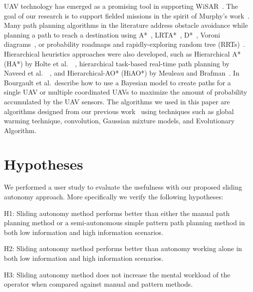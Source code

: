 \documentclass[journal]{IEEEtran}
\begin{document}
UAV technology has emerged as a promising tool in supporting WiSAR~\cite{Murphy2008Cooperative,Bourgault2003Coordinated}. The goal of our research is to support fielded missions in the spirit of Murphy's work~\cite{Casper2003Human}. Many path planning algorithms in the literature address obstacle avoidance while planning a path to reach a destination using A*~\cite{Quigley2005Towards}, LRTA*~\cite{Howlett2006Learning}, D*~\cite{Stentz1997Optimal}, Voroni diagrams~\cite{Bortoff2000Path,Beard2005Autonomous}, or probability roadmaps and rapidly-exploring random tree (RRTs)~\cite{Pettersson2006Probabilistic}. Hierarchical heuristics approaches were also developed, such as Hierarchical A* (HA*) by Holte et al.\ ~\cite{Holte1996Hierarchical}, hierarchical task-based real-time path planning by Naveed et al.\ ~\cite{Meuleau2007Hierarchical}, and Hierarchical-AO* (HiAO*) by Meuleau and Brafman~\cite{Naveed2010Hierarchical}. In~\cite{Bourgault2006Optimal, Bourgault2004Coordinated} Bourgault et al.\ describe how to use a Bayesian model to create paths for a single UAV or multiple coordinated UAVs to maximize the amount of probability accumulated by the UAV sensors. The algorithms we used in this paper are algorithms designed from our previous work~\cite{Lin2009UAV,Lin2014Hierarchical} using techniques such as global warming technique, convolution, Gaussian mixture models, and Evolutionary Algorithm.

\section{Hypotheses} 
\label{sec:Hypotheses}

We performed a user study to evaluate the usefulness with our proposed sliding autonomy approach. More specifically we verify the following hypotheses:

H1: Sliding autonomy method performs better than either the manual path planning method or a semi-autonomous simple pattern path planning method in both low information and high information scenarios.

H2: Sliding autonomy method performs better than autonomy working alone in both low information and high information scenarios.

H3: Sliding autonomy method does not increase the mental workload of the operator when compared against manual and pattern methods.

\end{document}
